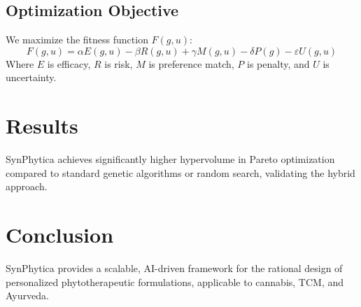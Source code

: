 \documentclass{article}
\begin{document}
\subsection{Optimization Objective}
We maximize the fitness function $F(g, u)$:
$$ F(g, u) = \alpha E(g,u) - \beta R(g,u) + \gamma M(g,u) - \delta P(g) - \varepsilon U(g,u) $$
Where $E$ is efficacy, $R$ is risk, $M$ is preference match, $P$ is penalty, and $U$ is uncertainty.

\section{Results}
SynPhytica achieves significantly higher hypervolume in Pareto optimization compared to standard genetic algorithms or random search, validating the hybrid approach.

\section{Conclusion}
SynPhytica provides a scalable, AI-driven framework for the rational design of personalized phytotherapeutic formulations, applicable to cannabis, TCM, and Ayurveda.
\end{document}
